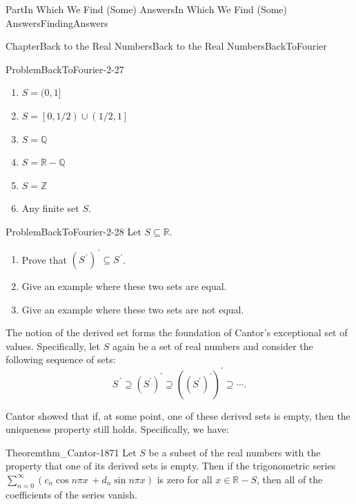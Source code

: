 \documentclass[oneside,10pt,]{book}
\numberwithin{equation}{part}
\newcommand{\RR}{\mathbb {R}}
\newcommand{\QQ}{\mathbb {Q}}
\newcommand{\ZZ}{\mathbb {Z}}
\begin{document}
\begin{partptx}{Part}{In Which We Find (Some) Answers}{}{In Which We Find (Some) Answers}{}{}{FindingAnswers}
\begin{chapterptx}{Chapter}{Back to the Real Numbers}{}{Back to the Real Numbers}{}{}{BackToFourier}
\begin{introduction}{}
\begin{problem}{Problem}{}{BackToFourier-2-27}
\begin{multicols}{2}
\begin{enumerate}[label={(\alph*)}]
\item{}\(\displaystyle S=(0,1]\)%
\item{}\(\displaystyle S=\left[\left.0,1/2\right)\right.\cup\left.\left(1/2,1\right.\right]\)%
\item{}\(\displaystyle S=\QQ\)%
\item{}\(\displaystyle S=\RR-\QQ\)%
\item{}\(\displaystyle S=\ZZ\)%
\item{}Any finite set \(S\).%
\end{enumerate}
\end{multicols}
%
\end{problem}
\begin{problem}{Problem}{}{BackToFourier-2-28}%
 Let \(S\subseteq\RR\).%
\begin{enumerate}[label={(\alph*)}]
\item{}Prove that \(\left(S^{\,\prime}\right)^{\,\prime}\subseteq
S^{\,\prime}\).%
\item{}Give an example where these two sets are equal.%
\item{}Give an example where these two sets are not equal.%
\end{enumerate}
%
\end{problem}
The notion of the derived set forms the foundation of Cantor's exceptional set of values.  Specifically, let \(S\) again be a set of real numbers and consider the following sequence of sets:%
\begin{equation*}
S^{\,\prime}\supseteq \left(S^\prime\right)^\prime\supseteq \left(\left(S^\prime\right)^\prime\right)^\prime\supseteq \cdots\text{.}
\end{equation*}
%
\par
{} Cantor showed that if, at some point, one of these derived sets is empty, then the uniqueness property still holds. Specifically, we have:%
\begin{theorem}{Theorem}{}{}{thm_Cantor-1871}%
%
Let \(S\) be a subset of the real numbers with the property that one of its derived sets is empty.  Then if the trigonometric series \(\sum_{n=0}^\infty\left(c_n\cos n\pi
x\,+d_n\sin n\pi x\right)\) is zero for all \(x\in\RR-S\), then all of the coefficients of the series vanish.%
\end{theorem}
\end{introduction}%
%
%
\typeout{************************************************}

\end{chapterptx}
\end{partptx}
\end{document}
